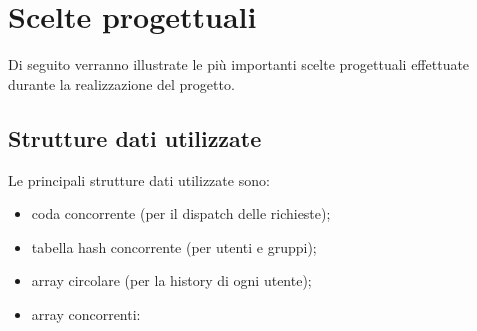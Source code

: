 
\section{Scelte progettuali}
Di seguito verranno illustrate le più importanti scelte progettuali effettuate durante la realizzazione del progetto.

\subsection{Strutture dati utilizzate}
Le principali strutture dati utilizzate sono:
\begin{itemize}
	\item coda concorrente (per il dispatch delle richieste);
	\item tabella hash concorrente (per utenti e gruppi);
	\item array circolare (per la history di ogni utente);
	\item array concorrenti:
\end{itemize}
